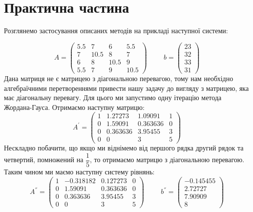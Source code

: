 \section*{\centering Практична частина}

Розглянемо застосування описаних методів на прикладі наступної системи:

\[
    A = \begin{pmatrix}
        5.5 & 7 & 6 & 5.5 \\
        7 & 10.5 & 8 & 7 \\
        6 & 8 & 10.5 & 9 \\
        5.5 & 7 & 9 & 10.5
    \end{pmatrix} \hspace{1cm}
    b = \begin{pmatrix}
        23 \\
        32 \\
        33 \\
        31
    \end{pmatrix}
\]
Дана матриця не є матрицею з діагональною перевагою,
тому нам необхідно алгебраїчними перетвореннями привести нашу
задачу до вигляду з матрицею, яка має діагональну перевагу.
Для цього ми запустимо одну ітерацію метода Жордана-Гауса.
Отримаємо наступну матрицю:
\[
    A^{'} = \begin{pmatrix}
        1 & 1.27273 & 1.09091 & 1 \\
        0 & 1.59091 & 0.363636 & 0 \\
        0 & 0.363636 & 3.95455 & 3 \\
        0 & 0 & 3 & 5
    \end{pmatrix}
\]
Нескладно побачити, що якщо ми віднімемо від
першого рядка другий рядок та четвертий, помножений на $\dfrac{1}{5}$,
то отримаємо матрицю з діагональною перевагою.
Таким чином ми маємо наступну систему рівнянь:
\[
    A^{''} = \begin{pmatrix}
        1 & -0.318182 & 0.127273 & 0 \\
        0 & 1.59091 & 0.363636 & 0 \\
        0 & 0.363636 & 3.95455 & 3 \\
        0 & 0 & 3 & 5
    \end{pmatrix} \hspace{1cm}
    b^{''} = \begin{pmatrix}
            -0.145455 \\ 2.72727 \\ 7.90909 \\ 8
    \end{pmatrix}
\]
